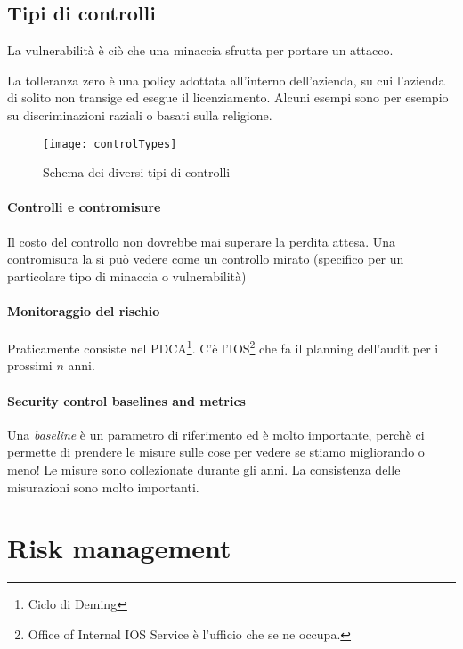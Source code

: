 \subsection{Tipi di controlli}

La vulnerabilità è ciò che una minaccia sfrutta per portare un attacco.


La tolleranza zero è una policy adottata all'interno dell'azienda, su cui
l'azienda di solito non transige ed esegue il licenziamento. Alcuni esempi sono
per esempio su discriminazioni raziali o basati sulla religione.

\begin{figure}[H]
 \centering
 \texttt{[image: controlTypes]}
 \caption{Schema dei diversi tipi di controlli}
\end{figure}



\paragraph*{Controlli e contromisure}

Il costo del controllo non dovrebbe mai superare la perdita attesa.
Una contromisura la si può vedere come un controllo mirato (specifico per un
particolare tipo di minaccia o vulnerabilità)


\paragraph*{Monitoraggio del rischio}

Praticamente consiste nel PDCA\footnote{Ciclo di Deming}.
C'è l'IOS\footnote{Office of Internal IOS Service è l'ufficio che se ne occupa.}
che fa il planning dell'audit per i prossimi $n$ anni.


\paragraph*{Security control baselines and metrics}

Una \textit{baseline} è un parametro di riferimento ed è molto importante,
perchè ci permette di prendere le misure sulle cose per vedere se stiamo
migliorando o meno!
Le misure sono collezionate durante gli anni. La consistenza delle misurazioni
sono molto importanti.

\section{Risk management}

